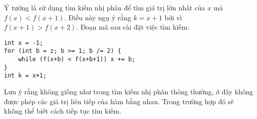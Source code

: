 Ý tưởng là sử dụng tìm kiếm nhị phân
để tìm giá trị lớn nhất của $x$
mà $f(x)<f(x+1)$.
Điều này ngụ ý rằng $k=x+1$
bởi vì $f(x+1)>f(x+2)$.
Đoạn mã sau cài đặt việc tìm kiếm: 

\begin{lstlisting}
int x = -1;
for (int b = z; b >= 1; b /= 2) {
    while (f(x+b) < f(x+b+1)) x += b;
}
int k = x+1;
\end{lstlisting}

Lưu ý rằng không giống như trong tìm kiếm nhị phân thông thường,
ở đây không được phép các giá trị liên tiếp
của hàm bằng nhau.
Trong trường hợp đó sẽ không thể biết
cách tiếp tục tìm kiếm.